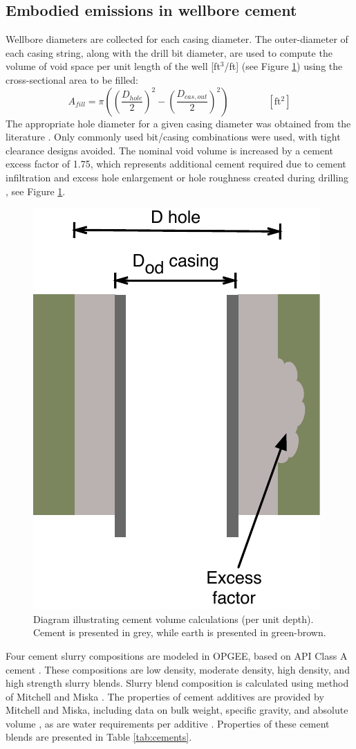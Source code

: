 \documentclass[11pt]{report}
\newcommand{\eqnunit}[1]{\quad\quad \scriptstyle{\left[\text{#1}\right]}}
\begin{document}
\subsection{Embodied emissions in wellbore cement}

Wellbore  diameters are collected for each casing diameter. The outer-diameter of each casing string, along with the drill bit diameter, are used to compute the volume of void space per unit length of the well [ft$^3$/ft] (see Figure \ref{fig:cement_volume}) using the cross-sectional area to be filled:
\begin{equation}
A_{fill} = \pi\left(\left(\frac{D_{hole}}{2}\right)^2-\left(\frac{D_{cas,out}}{2}\right)^2\right) \quad\quad\eqnunit{ft$^2$}
\end{equation}
The appropriate hole diameter  for a given casing diameter was obtained from the literature \cite[Figure 7.18]{Mitchell2011}. Only commonly used bit/casing combinations were used, with tight clearance designs avoided. The nominal void volume is increased by a cement excess factor of 1.75, which represents additional cement required due to cement infiltration and excess hole enlargement or hole roughness created during drilling \cite[Example 4.5]{Mitchell2011}, see Figure \ref{fig:cement_volume}. 

\begin{figure}[t]
\includegraphics[width=0.35\columnwidth]{images/cementing_volume.pdf}
\caption{Diagram illustrating cement volume calculations (per unit depth). Cement is presented in grey, while earth is presented in green-brown.}
\label{fig:cement_volume}
\end{figure}

Four cement slurry compositions are modeled in OPGEE, based on API Class A cement \cite[Table 4.2]{Mitchell2011}. These compositions are low density, moderate density, high density, and high strength slurry blends. Slurry blend composition is calculated using method of Mitchell and Miska \cite[Examples 4.3, 4.4, 4.5]{Mitchell2011}. The properties of cement additives are provided by Mitchell and Miska, including data on bulk weight, specific gravity, and absolute volume \cite[Table 4.4]{Mitchell2011}, as are water requirements per additive \cite[Table 4.5]{Mitchell2011}. Properties of these cement blends are presented in Table \ref{tab:cements}.
\end{document}
